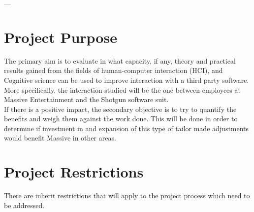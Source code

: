 \documentclass{article}
\begin{document}
\tableofcontents

\begin{center}
---
\end{center}

\section{Project Purpose}

  The primary aim is to evaluate in what capacity, if any, theory and practical
  results gained from the fields of human-computer interaction\cite{c_hci}
  (HCI), and Cognitive science\cite{c_congnitivescience} can be used to improve
  interaction with a third party software. More specifically, the interaction
  studied will be the one between employees at Massive
  Entertainment\cite{c_massive} and the Shotgun\cite{c_shotgun} software suit.
  \\

  If there is a positive impact, the secondary objective is to try to
  quantify the benefits and weigh them against the work done. This will be done
  in order to determine if investment in and expansion of this type of tailor
  made adjustments would benefit Massive in other areas.




\section{Project Restrictions}


  There are inherit restrictions that will apply to the project process which
  need to be addressed.
\end{document}
